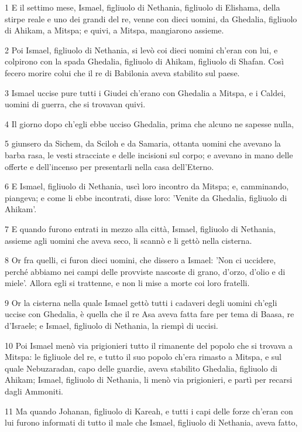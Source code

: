 \par 1 E il settimo mese, Ismael, figliuolo di Nethania, figliuolo di Elishama, della stirpe reale e uno dei grandi del re, venne con dieci uomini, da Ghedalia, figliuolo di Ahikam, a Mitspa; e quivi, a Mitspa, mangiarono assieme.
\par 2 Poi Ismael, figliuolo di Nethania, si levò coi dieci uomini ch'eran con lui, e colpirono con la spada Ghedalia, figliuolo di Ahikam, figliuolo di Shafan. Così fecero morire colui che il re di Babilonia aveva stabilito sul paese.
\par 3 Ismael uccise pure tutti i Giudei ch'erano con Ghedalia a Mitspa, e i Caldei, uomini di guerra, che si trovavan quivi.
\par 4 Il giorno dopo ch'egli ebbe ucciso Ghedalia, prima che alcuno ne sapesse nulla,
\par 5 giunsero da Sichem, da Sciloh e da Samaria, ottanta uomini che avevano la barba rasa, le vesti stracciate e delle incisioni sul corpo; e avevano in mano delle offerte e dell'incenso per presentarli nella casa dell'Eterno.
\par 6 E Ismael, figliuolo di Nethania, uscì loro incontro da Mitspa; e, camminando, piangeva; e come li ebbe incontrati, disse loro: 'Venite da Ghedalia, figliuolo di Ahikam'.
\par 7 E quando furono entrati in mezzo alla città, Ismael, figliuolo di Nethania, assieme agli uomini che aveva seco, li scannò e li gettò nella cisterna.
\par 8 Or fra quelli, ci furon dieci uomini, che dissero a Ismael: 'Non ci uccidere, perché abbiamo nei campi delle provviste nascoste di grano, d'orzo, d'olio e di miele'. Allora egli si trattenne, e non li mise a morte coi loro fratelli.
\par 9 Or la cisterna nella quale Ismael gettò tutti i cadaveri degli uomini ch'egli uccise con Ghedalia, è quella che il re Asa aveva fatta fare per tema di Baasa, re d'Israele; e Ismael, figliuolo di Nethania, la riempì di uccisi.
\par 10 Poi Ismael menò via prigionieri tutto il rimanente del popolo che si trovava a Mitspa: le figliuole del re, e tutto il suo popolo ch'era rimasto a Mitspa, e sul quale Nebuzaradan, capo delle guardie, aveva stabilito Ghedalia, figliuolo di Ahikam; Ismael, figliuolo di Nethania, li menò via prigionieri, e partì per recarsi dagli Ammoniti.
\par 11 Ma quando Johanan, figliuolo di Kareah, e tutti i capi delle forze ch'eran con lui furono informati di tutto il male che Ismael, figliuolo di Nethania, aveva fatto,

